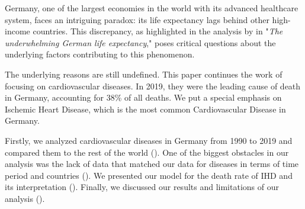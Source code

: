 
Germany, one of the largest economies in the world with its advanced healthcare 
system, faces an intriguing paradox: its life expectancy lags behind other 
high-income countries. This discrepancy, as highlighted in the analysis by 
\citet{Jasilionis2023} in "\textit{The underwhelming German life expectancy}," 
poses critical questions about the underlying factors contributing to this 
phenomenon.

The underlying reasons are still undefined. This paper continues the work of \citet{Jasilionis2023} focusing on cardiovascular diseases. In 2019, they were the leading cause of death in Germany, accounting for 38\% of all deaths. 
We put a special emphasis on Ischemic Heart Disease, which is the most common Cardiovascular Disease in Germany.


Firstly, we analyzed cardiovascular diseases in Germany from 1990 to 2019 and compared them to the rest of the world (). One of the biggest obstacles in our analysis was the lack of data that matched our data for diseases in terms of time period and countries (). We presented our model for the death rate of IHD and its interpretation (). Finally, we discussed our results and limitations of our analysis ().
